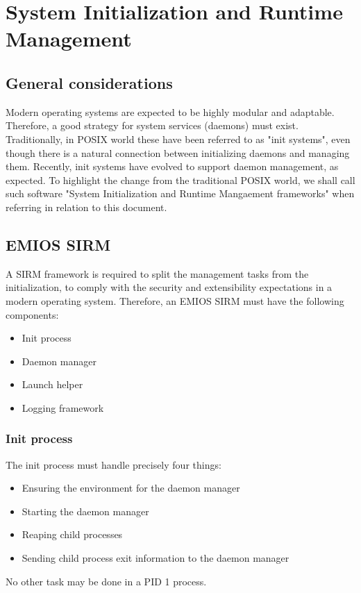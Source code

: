 	\section{System Initialization and Runtime Management}
\subsection{General considerations}
Modern operating systems are expected to be highly modular and adaptable. Therefore, a good strategy for system services (daemons) must exist. Traditionally, in POSIX world these have been referred to as "init systems", even though there is a natural connection between initializing daemons and managing them. Recently, init systems have evolved to support daemon management, as expected. To highlight the change from the traditional POSIX world, we shall call such software "System Initialization and Runtime Mangaement frameworks" when referring in relation to this document.
\subsection{EMIOS SIRM}
A SIRM framework is required to split the management tasks from the initialization, to comply with the security and extensibility expectations in a modern operating system.
Therefore, an EMIOS SIRM must have the following components:
\begin{itemize}
	\item Init process
	\item Daemon manager
	\item Launch helper
	\item Logging framework
\end{itemize}
\subsubsection{Init process}
The init process must handle precisely four things:
\begin{itemize}
	\item Ensuring the environment for the daemon manager
	\item Starting the daemon manager
	\item Reaping child processes
	\item Sending child process exit information to the daemon manager
\end{itemize}
No other task may be done in a PID 1 process.

